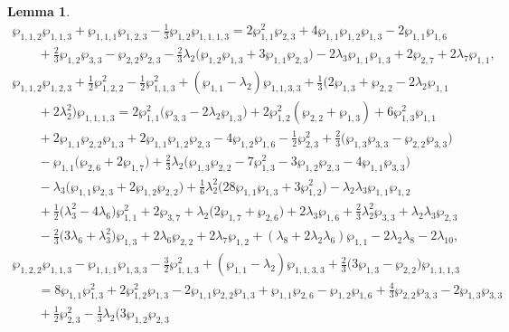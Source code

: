 \documentclass[pdftex]{sigma}
\numberwithin{equation}{section}
\newtheorem{Lemma}[Theorem]{Lemma}
\begin{document}
\begin{Lemma}
\begin{gather*}
 \wp_{1,1,2}\wp_{1,1,3} + \wp_{1,1,1}\wp_{1,2,3} - \tfrac{1}{3} \wp_{1,2} \wp_{1,1,1,3} =
 2 \wp_{1,1}^2 \wp_{2,3} + 4 \wp_{1,1} \wp_{1,2} \wp_{1,3} - 2\wp_{1,1} \wp_{1,6}\\
 \qquad{} + \tfrac{2}{3} \wp_{1,2} \wp_{3,3} - \wp_{2,2} \wp_{2,3} - \tfrac{2}{3} \lambda_2 \big(\wp_{1,2}\wp_{1,3} + 3 \wp_{1,1} \wp_{2,3}\big) - 2\lambda_3 \wp_{1,1} \wp_{1,3} + 2\wp_{2,7} + 2 \lambda_7 \wp_{1,1},\\
 \wp_{1,1,2}\wp_{1,2,3} + \tfrac{1}{2} \wp_{1,2,2}^2 - \tfrac{1}{2} \wp_{1,1,3}^2
 + (\wp_{1,1}-\lambda_2) \wp_{1,1,3,3} + \tfrac{1}{3} \big(2\wp_{1,3} + \wp_{2,2} - 2\lambda_2\wp_{1,1}\\
 \qquad{} + 2\lambda_2^2 \big) \wp_{1,1,1,3} = 2 \wp_{1,1}^2 \big(\wp_{3,3} - 2\lambda_2 \wp_{1,3} \big) + 2\wp_{1,2}^2 (\wp_{2,2}
 + \wp_{1,3}) + 6 \wp_{1,3}^2 \wp_{1,1}\\
 \qquad{}+ 2 \wp_{1,1} \wp_{2,2} \wp_{1,3} + 2 \wp_{1,1} \wp_{1,2} \wp_{2,3} - 4 \wp_{1,2} \wp_{1,6} - \tfrac{1}{2} \wp_{2,3}^2
 + \tfrac{2}{3} \big(\wp_{1,3} \wp_{3,3} - \wp_{2,2} \wp_{3,3}\big)\\
 \qquad{} - \wp_{1,1} \big(\wp_{2,6} + 2\wp_{1,7}\big) + \tfrac{2}{3} \lambda_2 \big(\wp_{1,3} \wp_{2,2} - 7 \wp_{1,3}^2 - 3 \wp_{1,2} \wp_{2,3} - 4 \wp_{1,1} \wp_{3,3}\big) \\
 \qquad{} - \lambda_3 \big(\wp_{1,1} \wp_{2,3} + 2\wp_{1,2} \wp_{2,2}\big)
 + \tfrac{1}{6} \lambda_2^2 \big(28 \wp_{1,1} \wp_{1,3} + 3 \wp_{1,2}^2 \big) - \lambda_2 \lambda_3 \wp_{1,1} \wp_{1,2}\\
\qquad{} + \tfrac{1}{2} \big( \lambda_3^2 - 4\lambda_6 \big) \wp_{1,1}^2 + 2\wp_{3,7}
 + \lambda_2 \big(2\wp_{1,7} + \wp_{2,6}\big) + 2\lambda_3 \wp_{1,6} + \tfrac{2}{3} \lambda_2^2 \wp_{3,3} + \lambda_2 \lambda_3 \wp_{2,3} \\
\qquad{} - \tfrac{2}{3} \big(3 \lambda_6 + \lambda_3^2\big) \wp_{1,3} + 2\lambda_6 \wp_{2,2}
 + 2\lambda_7 \wp_{1,2} + (\lambda_8 + 2\lambda_2 \lambda_6) \wp_{1,1} - 2 \lambda_2 \lambda_8 - 2 \lambda_{10},\\
 \wp_{1,2,2}\wp_{1,1,3} - \wp_{1,1,1}\wp_{1,3,3} - \tfrac{3}{2} \wp_{1,1,3}^2
 + (\wp_{1,1} - \lambda_2) \wp_{1,1,3,3} + \tfrac{2}{3} \big(3\wp_{1,3} - \wp_{2,2}\big) \wp_{1,1,1,3}\\
 \qquad{} = 8 \wp_{1,1} \wp_{1,3}^2 + 2 \wp_{1,2}^2 \wp_{1,3} - 2 \wp_{1,1} \wp_{2,2} \wp_{1,3}
 + \wp_{1,1} \wp_{2,6} - \wp_{1,2} \wp_{1,6} + \tfrac{4}{3} \wp_{2,2} \wp_{3,3} - 2 \wp_{1,3} \wp_{3,3}\\
 \qquad{} + \tfrac{1}{2} \wp_{2,3}^2 - \tfrac{1}{3} \lambda_2 \big(3 \wp_{1,2} \wp_{2,3}

\end{gather*}
\end{Lemma}
\end{document}
